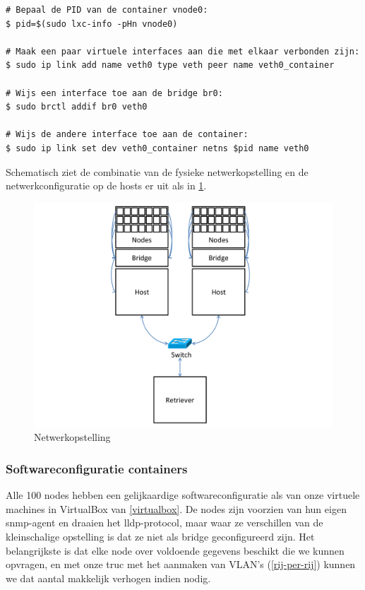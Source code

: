 \begin{lstlisting}[caption={Linux containers verbinden met een bridge\cite{lxc-config}}]
# Bepaal de PID van de container vnode0:
$ pid=$(sudo lxc-info -pHn vnode0)

# Maak een paar virtuele interfaces aan die met elkaar verbonden zijn:
$ sudo ip link add name veth0 type veth peer name veth0_container

# Wijs een interface toe aan de bridge br0:
$ sudo brctl addif br0 veth0

# Wijs de andere interface toe aan de container:
$ sudo ip link set dev veth0_container netns $pid name veth0
\end{lstlisting}

Schematisch ziet de combinatie van de fysieke netwerkopstelling en de netwerkconfiguratie op de hosts er uit als in \cref{fig-vwall-opstelling}.

\begin{figure}[h]
	\centering
	\includegraphics[scale=0.50]{figures/virtual-wall-opstelling}
	\caption{Netwerkopstelling \vwall{}}
	\label{fig-vwall-opstelling}
\end{figure}



\subsubsection{Softwareconfiguratie containers}

Alle 100 nodes hebben een gelijkaardige softwareconfiguratie als van onze virtuele machines in VirtualBox van \cref{virtualbox}.
De nodes zijn voorzien van hun eigen \gls{snmp-agent} en draaien het \gls{lldp}-protocol,
maar waar ze verschillen van de kleinschalige opstelling is dat ze niet als bridge geconfigureerd zijn.
Het belangrijkste is dat elke node over voldoende gegevens beschikt die we kunnen opvragen,
en met onze truc met het aanmaken van VLAN's (\cref{rij-per-rij}) kunnen we dat aantal makkelijk verhogen indien nodig.


